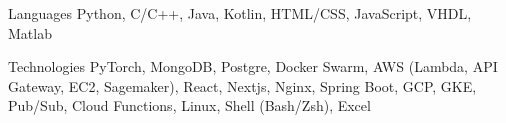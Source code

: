 

\begin{cvskills}

  \cvskill
    {Languages} %
    {Python, C/C++, Java, Kotlin, HTML/CSS, JavaScript, VHDL, Matlab} %

  \cvskill
    {Technologies} %
    {PyTorch, MongoDB, Postgre, Docker Swarm, AWS (Lambda, API Gateway, EC2, Sagemaker), React, Nextjs, Nginx, Spring Boot, GCP, GKE, Pub/Sub, Cloud Functions, Linux, Shell (Bash/Zsh), Excel}





\end{cvskills}



